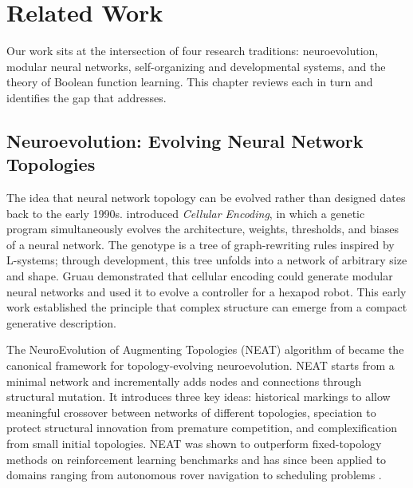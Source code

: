 
\chapter{Related Work}
\label{ch:related}

Our work sits at the intersection of four research traditions: neuroevolution,
modular neural networks, self-organizing and developmental systems, and the
theory of Boolean function learning. This chapter reviews each in turn and
identifies the gap that \modnet{} addresses.

\section{Neuroevolution: Evolving Neural Network Topologies}
\label{sec:neat}

The idea that neural network topology can be evolved rather than designed
dates back to the early 1990s. \citet{gruau1994neural} introduced
\emph{Cellular Encoding}, in which a genetic program simultaneously evolves
the architecture, weights, thresholds, and biases of a neural network. The
genotype is a tree of graph-rewriting rules inspired by L-systems; through
development, this tree unfolds into a network of arbitrary size and shape.
Gruau demonstrated that cellular encoding could generate modular neural
networks and used it to evolve a controller for a hexapod robot. This early
work established the principle that complex structure can emerge from a
compact generative description.

The NeuroEvolution of Augmenting Topologies (NEAT) algorithm of
\citet{stanley2002evolving} became the canonical framework for topology-evolving
neuroevolution. NEAT starts from a minimal network and incrementally adds nodes
and connections through structural mutation. It introduces three key ideas:
historical markings to allow meaningful crossover between networks of different
topologies, speciation to protect structural innovation from premature
competition, and complexification from small initial topologies. NEAT was shown
to outperform fixed-topology methods on reinforcement learning benchmarks
\citep{stanley2002efficient} and has since been applied to domains ranging from
autonomous rover navigation \citep{shrestha2025reinforced} to scheduling
problems \citep{neat2024scheduling}.

